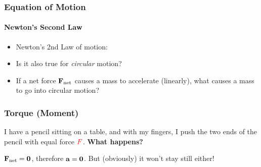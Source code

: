 \documentclass[12pt,compress,aspectratio=169]{beamer}
\newcommand{\mb}[1]{\ensuremath\mathbf{#1}}
\begin{document}
\begin{frame}
  \frametitle{Equation of Motion}
  \framesubtitle{Newton's Second Law}
  \begin{itemize}
  \item Newton's 2nd Law of motion:
    
    \vspace{-0.3in}{\LARGE
    \begin{displaymath}
      \mb{F}_\mathrm{net}=m\mb{a}
    \end{displaymath}
  }
  \item Is it also true for \emph{circular} motion?
  \item If a net force $\mb{F}_\mathrm{net}$ causes a mass to accelerate
    (linearly), what causes a mass to go into circular motion?
  \end{itemize}

\end{frame}

\begin{frame}
  \frametitle{Torque (Moment)}
  I have a pencil sitting on a table, and with my fingers, I push the two ends
  of the pencil with equal force $\textcolor{red}{F}$. \textbf{What happens?}
  \begin{center}
  \end{center}
  $\mb{F}_\mathrm{net}=\mb{0}$, therefore $\mb{a}=\mb{0}$. But (obviously) it
  won't stay still either!
\end{frame}
\end{document}
